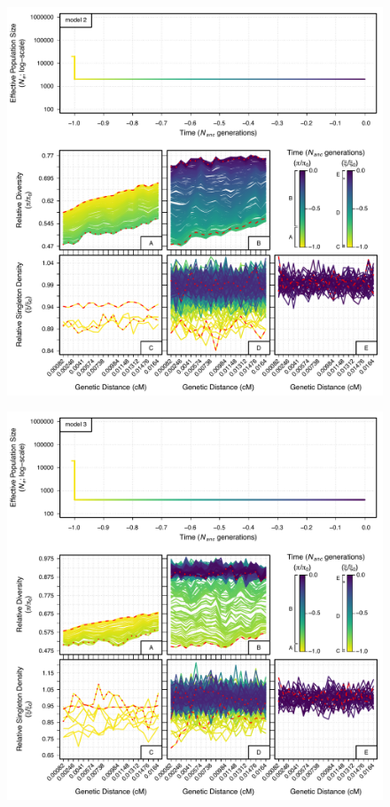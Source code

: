 \documentclass[9pt,twocolumn,twoside]{rilabRxiv}
\begin{document}
\begin{figure}[htb]
    \centering
    \includegraphics[width=\linewidth]{figures/FigS10.pdf}
\end{figure}
\begin{figure}[htb]\ContinuedFloat
    \centering
    \includegraphics[width=\linewidth]{figures/FigS11.pdf}
\end{figure}
\end{document}
